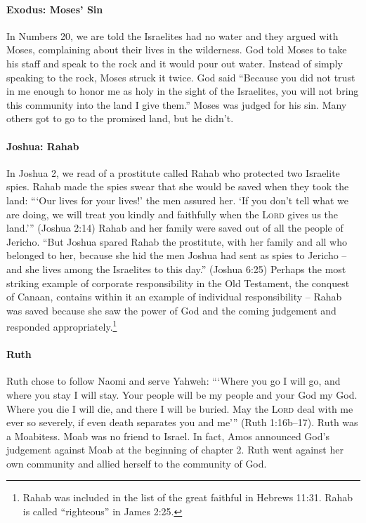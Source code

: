 \paragraph{Exodus: Moses' Sin} In Numbers 20, we are told the Israelites had no
water and they argued with Moses, complaining about their lives in the
wilderness. God told Moses to take his staff and speak to the rock and it would
pour out water. Instead of simply speaking to the rock, Moses struck it twice.
God said \enquote{Because you did not trust in me enough to honor me as holy in
the sight of the Israelites, you will not bring this community into the land I
give them.} Moses was judged for his sin. Many others got to go to the promised
land, but he didn't.

\paragraph{Joshua: Rahab} In Joshua 2, we read of a prostitute called Rahab who
protected two Israelite spies. Rahab made the spies swear that she would be
saved when they took the land: \enquote{\enquote{Our lives for your lives!} the
men assured her. \enquote{If you don't tell what we are doing, we will treat you
kindly and faithfully when the \textsc{Lord} gives us the land.}} (Joshua 2:14)
Rahab and her family were saved out of all the people of Jericho. \enquote{But
Joshua spared Rahab the prostitute, with her family and all who belonged to her,
because she hid the men Joshua had sent as spies to Jericho -- and she lives
among the Israelites to this day.} (Joshua 6:25) Perhaps the most striking
example of corporate responsibility in the Old Testament, the conquest of
Canaan, contains within it an example of individual responsibility -- Rahab was
saved because she saw the power of God and the coming judgement and responded
appropriately.\footnote{%
    Rahab was included in the list of the great faithful in Hebrews 11:31. Rahab
    is called \enquote{righteous} in James 2:25.
}

\paragraph{Ruth} Ruth chose to follow Naomi and serve Yahweh:
\enquote{\enquote{Where you go I will go, and where you stay I will stay. Your
people will be my people and your God my God. Where you die I will die, and
there I will be buried. May the \textsc{Lord} deal with me ever so severely, if
even death separates you and me}} (Ruth 1:16b--17). Ruth was a Moabitess. Moab
was no friend to Israel. In fact, Amos announced God's judgement against Moab at
the beginning of chapter 2. Ruth went against her own community and allied
herself to the community of God.

